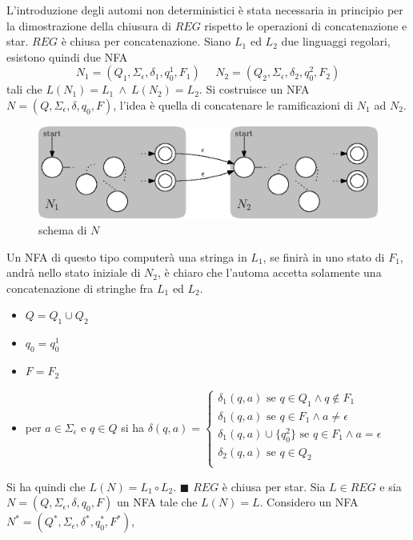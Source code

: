 \documentclass[10pt, letterpaper]{report}
\begin{document}
L'introduzione degli automi non deterministici è stata necessaria in principio per la dimostrazione della chiusura 
di $REG$ rispetto le operazioni di concatenazione e star.\acc 
\teo{} $REG$ è chiusa per concatenazione.\acc 
\dimo{} Siano $L_1$ ed $L_2$ due linguaggi regolari, esistono quindi due NFA 
$$ N_1=(Q_1,\Sigma_\epsilon,\delta_1,q_0^1,F_1)\ \ \ \ \ \  
N_2=(Q_2,\Sigma_\epsilon,\delta_2,q_0^2,F_2)$$
tali che $L(N_1)=L_1 \ \land \ L(N_2)=L_2$. Si costruisce un NFA $N=(Q,\Sigma_\epsilon,\delta,q_0,F)$, l'idea è quella 
di concatenare le ramificazioni di $N_1$ ad $N_2$.
\begin{center}
    \begin{figure}[h!]
        \centering 
        \includegraphics[width=1\textwidth ]{images/concatenazioneChiusa.eps}
        \caption{schema di $N$}
        \label{fig:concatenazioneChiusa}
    \end{figure}
\end{center}
Un NFA di questo tipo computerà una stringa in $L_1$, se finirà in uno stato di $F_1$, andrà nello stato iniziale 
di $N_2$, è chiaro che l'automa accetta solamente una concatenazione di stringhe fra $L_1$ ed $L_2$. \begin{itemize}
    \item $Q=Q_1\cup Q_2$
    \item $q_0=q_0^1$
    \item $F=F_2$
    \item per $a\in\Sigma_\epsilon$ e $q\in Q$ si ha $\delta(q,a)=\begin{cases}
        \delta_1(q,a) \text{ se }q\in Q_1\land q\notin F_1\\ 
        \delta_1(q,a)\text{ se }q\in F_1\land a\ne \epsilon\\ 
        \delta_1(q,a)\cup\{q_0^2\}\text{ se }q\in F_1\land a= \epsilon\\ 
        \delta_2(q,a)\text{ se }q\in Q_2\\
    \end{cases}$
\end{itemize}
Si ha quindi che $L(N)=L_1\circ L_2$. $\blacksquare$\acc 
\teo{} $REG$ è chiusa per star.\acc 
\dimo{} Sia $L\in REG$ e sia $N=(Q,\Sigma_\epsilon,\delta,q_{0},F)$ un NFA tale che $L(N)=L$. Considero un NFA $N^*=(Q^*,\Sigma_\epsilon,\delta^*,q_{0}^*,F^*)$,
\end{document}
